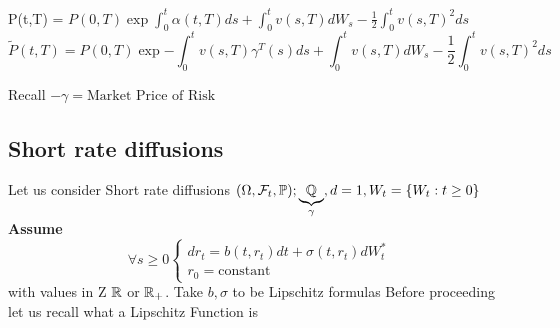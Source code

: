 P(t,T) = $P(0,T)\exp{\int_{0}^{t} \alpha(t,T)ds + \int_0^t v(s,T) dW_s -\frac{1}{2} \int_0^t v(s,T)^{2}ds}$
$$\tilde{P}(t,T) = P(0,T) \exp{-\int_0^t v(s,T)}\gamma^{T}(s)ds + \int_0^t v(s,T) dW_s - \frac{1}{2} \int_0
^t v(s,T)^{2} ds$$
\begin{rem}
 Recall $-\gamma= \text{Market Price of Risk}$
\end{rem}
\subsection{Short rate diffusions}
Let us consider Short rate diffusions 
$(\Omega, \mathcal{F}_t, \mathbb{P}); \underbrace{\mathbb{Q}}_{\gamma}, d=1, W_t = \left\lbrace W_t: t \geq 0\right\rbrace$
\textbf{Assume} \begin{equation}\label{dagger}
                 \forall s \geq 0 
\begin{cases} dr_{t}=b(t,r_{t})dt + \sigma(t,r_{t})dW^{*}_{t}  \\ 
r_{0} = \text{constant}
\end{cases} 
                \end{equation}
with values in Z $\mathbb{R}$ or $\mathbb{R}_{+}$.
Take $b, \sigma$ to be Lipschitz formulas
Before proceeding let us recall what a Lipschitz Function is
